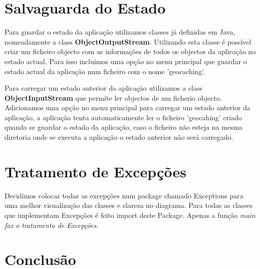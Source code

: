 \documentclass{article}
\begin{document}
\pagebreak
\section{Salvaguarda do Estado}
\par Para guardar o estado da aplicação utilizamos classes já definidas em Java, nomeadamente a class 
\textbf{ObjectOutputStream}. Utilizando esta classe é possível criar um ficheiro objecto com as informações de todos os 
objectos da aplicação no estado actual. Para isso incluimos uma opção no menu principal que guardar o estado actual 
da aplicação num ficheiro com o nome 'geocaching'.
\par Para carregar um estado anterior da aplicação utilizamos a class \textbf{ObjectInputStream} que permite ler objectos de 
um ficherio objecto. Adicionamos uma opção no menu principal para carregar um estado anterior da aplicação, a aplicação 
tenta automaticamente ler o ficheiro 'geocahing' criado quando se guardar o estado da aplicação, caso o ficheiro não esteja 
na mesma diretoria onde se executa a aplicação o estado anterior não será carregado.

\pagebreak
\section{Tratamento de Excepções}
\quad Decidimos colocar todas as excepções num package chamado Exceptions para uma melhor visualização das classes e 
clareza no diagrama. Para todas as classes que implementam Excepções é feito import deste Package. Apenas a função 
\em main faz o tratamento de Excepções.
\pagebreak
\section{Conclusão}
\end{document}
